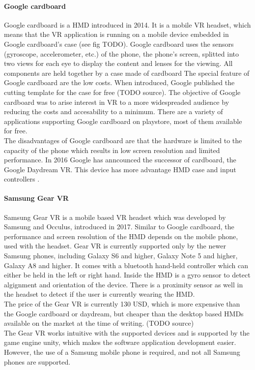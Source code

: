\paragraph{Google cardboard}
Google cardboard is a HMD introduced in 2014. It is a mobile VR headset, which means that the VR application is running on a mobile device embedded in Google cardboard's case (see fig TODO). Google cardboard uses the sensors (gyroscope, accelerometer, etc.) of the phone, the phone's screen, splitted into two views for each eye to display the content and lenses for the viewing. All components are held together by a case made of cardboard The special feature of Google cardboard are the low costs. When introduced, Google published the cutting template for the case for free (TODO source). The objective of Google cardboard was to arise interest in VR to a more widespreaded audience by reducing the costs and accesability to a minimum. There are a variety of applications supporting Google cardboard on playstore, most of them available for free. \cite{Tham.2018} \\
The disadvantages of Google cardboard are that the hardware is limited to the capacity of the phone which results in low screen resolution and limited performance.
In 2016 Google has anncounced the successor of cardboard, the Google Daydream VR. This device has more advantage HMD case and input controllers \cite{??}.

\paragraph{Samsung Gear VR} Samsung Gear VR is a mobile based VR headset which was developed by Samsung and Occulus, introduced in 2017. Similar to Google cardboard, the performance and screen resolution of the HMD depends on the mobile phone, used with the headset. Gear VR is currently supported only by the newer Samsung phones, including Galaxy S6 and higher, Galaxy Note 5 and higher, Galaxy A8 and higher.
It comes with a bluetooth hand-held controller which can either be held in the left or right hand. Inside the HMD is a gyro sensor to detect algignment and orientation of the device. There is a proximity sensor as well in the headset to detect if the user is currently wearing the HMD.  \cite{Samsung.2019}\\
The price of the Gear VR is currently 130 USD, which is more expensive than the Google cardboard or daydream, but cheaper than the desktop based HMDs available on the market at the time of writing. (TODO source)\\
The Gear VR works intuitive with the supported devices and is supported by the game engine unity, which makes the software application development easier. However, the use of a Samsung mobile phone is required, and not all Samsung phones are supported.
